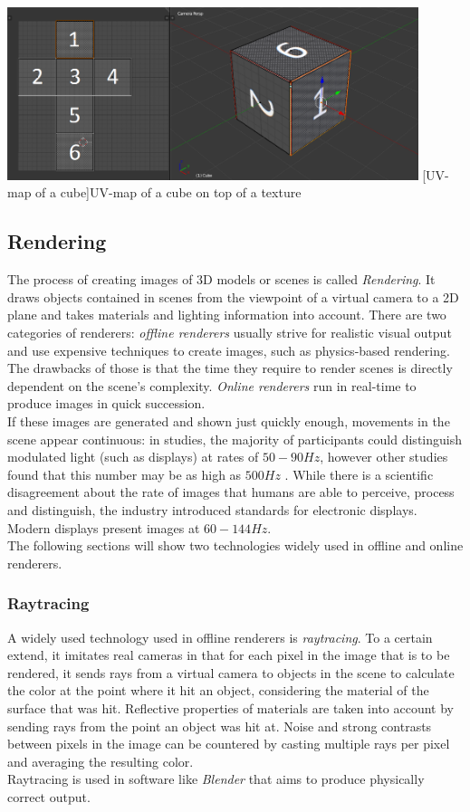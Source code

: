 \begin{center}
\noindent\includegraphics[width=12cm]{tex/img/ch03/CubeUVMapping.png}
[UV-map of a cube]{UV-map of a cube on top of a texture}
\label{fig:3d-cube-uv-mapping}
\end{center}

\subsection{Rendering}
The process of creating images of 3D models or scenes is called \emph{Rendering}. It draws objects contained in scenes from the viewpoint of a virtual camera to a 2D plane and takes materials and lighting information into account. There are two categories of renderers: \emph{offline renderers} usually strive for realistic visual output and use expensive techniques to create images, such as physics-based rendering. The drawbacks of those is that the time they require to render scenes is directly dependent on the scene's complexity. \emph{Online renderers} run in real-time to produce images in quick succession.\\
If these images are generated and shown just quickly enough, movements in the scene appear continuous: in studies, the majority of participants could distinguish modulated light (such as displays) at rates of $50-90 Hz$, however other studies found that this number may be as high as $500 Hz$ \cite{Davis2015}. While there is a scientific disagreement about the rate of images that humans are able to perceive, process and distinguish, the industry introduced standards for electronic displays. Modern displays present images at $60-144 Hz$.\\
The following sections will show two technologies widely used in offline and online renderers.

\subsubsection{Raytracing}
A widely used technology used in offline renderers is \emph{raytracing}. To a certain extend, it imitates real cameras in that for each pixel in the image that is to be rendered, it sends rays from a virtual camera to objects in the scene to calculate the color at the point where it hit an object, considering the material of the surface that was hit. Reflective properties of materials are taken into account by sending rays from the point an object was hit at. Noise and strong contrasts between pixels in the image can be countered by casting multiple rays per pixel and averaging the resulting color.\\
Raytracing is used in software like \emph{Blender} that aims to produce physically correct output.

